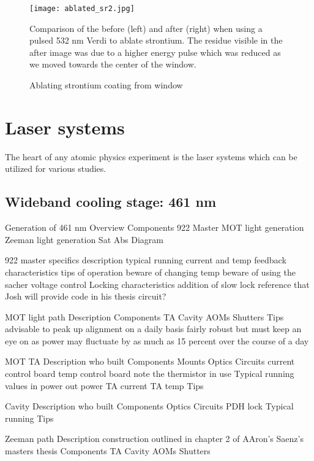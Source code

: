 	\begin{figure}
		\centerline{
		\texttt{[image: ablated\_sr2.jpg]}}
		\caption{Ablating strontium coating from window}{Comparison of the before (left) and after (right) when using a pulsed 532 nm Verdi to ablate strontium. The residue visible in the after image was due to a higher energy pulse which was reduced as we moved towards the center of the window.}
		\label{fig:ablating_strontium}
	\end{figure} 



\section{Laser systems}
\label{sec:laser_systems}

The heart of any atomic physics experiment is the laser systems which can be utilized for various studies. 

\subsection{Wideband cooling stage: 461 nm}
\label{ssec:461sys}

Generation of 461 nm
	Overview
	Components
		922 Master
		MOT light generation
		Zeeman light generation
		Sat Abs
	Diagram
	
	
922 master specifics
	description
	typical running current and temp
	feedback characteristics
	tips of operation
		beware of changing temp
		beware of using the sacher voltage control
	Locking characteristics
		addition of slow lock
			reference that Josh will provide code in his thesis
		circuit?
		
MOT light path
	Description
	Components
		TA
		Cavity
		AOMs
		Shutters
	Tips
		advisable to peak up alignment on a daily basis 		
		fairly robust but must keep an eye on as power may fluctuate by as much as 15 percent over the course of a day
	
	MOT TA
		Description
			who built
		Components
			Mounts
			Optics
			Circuits
				current control board
				temp control board
					note the thermistor in use
		Typical running values
			in power
			out power
			TA current
			TA temp
		Tips
		
	Cavity
		Description
			who built
		Components
			Optics
			Circuits
				PDH lock
		Typical running
		Tips
		
Zeeman path
	Description
		construction outlined in chapter 2 of AAron's Saenz's masters thesis
	Components
		TA
		Cavity
		AOMs
		Shutters
	
